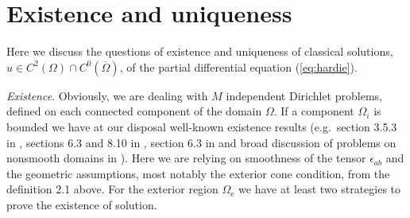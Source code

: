 \documentclass[12pt]{iopart}
\newcommand{\0}{\vct{0}}
\newcommand{\cl}[1]{\overline{#1}}
\theoremstyle{plain} \newtheorem{tm}{Theorem}[section]
\theoremstyle{plain} \newtheorem{lm}[tm]{Lemma}
\theoremstyle{definition} \newtheorem{defn}[tm]{Definition}
\begin{document}
\appendix
\section{Existence and uniqueness}%

Here we discuss the questions of existence and uniqueness of classical solutions, $u \in C^2(\Omega) \cap C^0(\cl{\Omega})$, of the partial differential equation (\ref{eq:hardie}).

\medskip

\emph{Existence}. Obviously, we are dealing with $M$ independent Dirichlet problems, defined on each connected component of the domain $\Omega$. If a component $\Omega_i$ is bounded we have at our disposal well-known existence results (e.g.~section 3.5.3 in \cite{Salsa}, sections 6.3 and 8.10 in \cite{GT}, section 6.3 in \cite{Evans} and broad discussion of problems on nonsmooth domains in \cite{Grisvard}). Here we are relying on smoothness of the tensor $\hat{\epsilon}_{ab}$ and the geometric assumptions, most notably the exterior cone condition, from the definition 2.1 above. For the exterior region $\Omega_{\mathrm{e}}$ we have at least two strategies to prove the existence of solution. 

\end{document}
